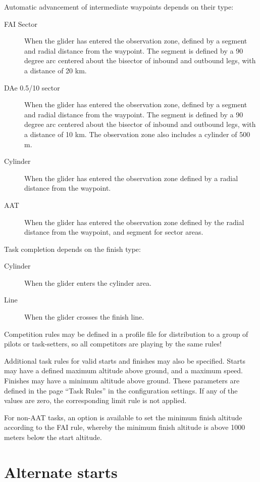 \documentclass[a4paper,12pt]{refrep}
\begin{document}
Automatic advancement of intermediate waypoints depends on their type:
\begin{description}
\item[FAI Sector] When the glider has entered the observation zone, defined 
by a segment and radial distance from the waypoint.  The segment is
defined by a 90 degree arc centered about the bisector of inbound and
outbound legs, with a distance of 20 km.
\item[DAe 0.5/10 sector] When the glider has entered the observation zone, 
defined by a segment and radial distance from the waypoint.  The segment is
defined by a 90 degree arc centered about the bisector of inbound and
outbound legs, with a distance of 10 km.  The observation zone also includes
a cylinder of 500 m.
\item[Cylinder]  When the glider has entered the observation zone defined
by a radial distance from the waypoint.
\item[AAT] When the glider has entered the observation zone defined by the
radial distance from the waypoint, and segment for sector areas.
\end{description}

Task completion depends on the finish type:
\begin{description}
\item[Cylinder] When the glider enters the cylinder area.
\item[Line] When the glider crosses the finish line.
\end{description}

\tip Competition rules may be defined in a profile file for
distribution to a group of pilots or task-setters, so all competitors
are playing by the same rules!

Additional task rules for valid starts and finishes may also be
specified.  Starts may have a defined maximum altitude above ground,
and a maximum speed.  Finishes may have a minimum altitude above
ground.  These parameters are defined in the page ``Task Rules'' in
the configuration settings.  If any of the values are zero, the
corresponding limit rule is not applied.

For non-AAT tasks, an option is available to set the minimum finish
altitude according to the FAI rule, whereby the minimum finish
altitude is above 1000 meters below the start altitude.

\section{Alternate starts}\label{sec:alternate-starts}
\end{document}
